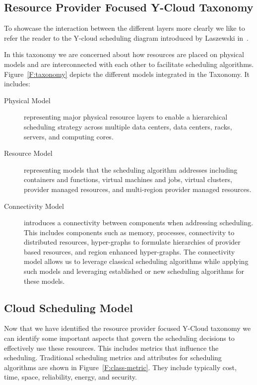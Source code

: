 \documentclass[final,5p,times,twocolumn]{elsarticle}
\begin{document}


\subsection{Resource Provider Focused Y-Cloud Taxonomy}

To showcase the interaction between the different layers more clearly
we like to refer the reader to the Y-cloud scheduling diagram
introduced by Laszewski in~\cite{las18cloudscheduling-whitepaper}.

In this taxonomy we are concerned about how resources are placed on
physical models and are interconnected with each other to facilitate
scheduling algorithms. Figure~\ref{F:taxonomy} depicts the different
models integrated in the Taxonomy. It includes:

\begin{description}

\item[Physical Model] representing major physical resource layers to
  enable a hierarchical scheduling strategy across multiple data
  centers, data centers, racks, servers, and computing cores.

\item[Resource Model] representing models that the scheduling
  algorithm addresses including containers and functions, virtual
  machines and jobs, virtual clusters, provider managed resources, and
  multi-region provider managed resources.

\item[Connectivity Model] introduces a connectivity between components
  when addressing scheduling. This includes components such as memory,
  processes, connectivity to distributed resources, hyper-graphs to
  formulate hierarchies of provider based resources, and region
  enhanced hyper-graphs. The connectivity model allows us to leverage
  classical scheduling algorithms while applying such models and
  leveraging established or new scheduling algorithms for these
  models.

\end{description}



\subsection{Cloud Scheduling Model}

Now that we have identified the resource provider focused Y-Cloud
taxonomy we can identify some important aspects that govern the
scheduling decisions to effectively use these resources. This includes
metrics that influence the scheduling. Traditional scheduling metrics
and attributes for scheduling algorithms are shown in
Figure~\ref{F:class-metric}. They include typically cost, time, space,
reliability, energy, and security.
\end{document}
